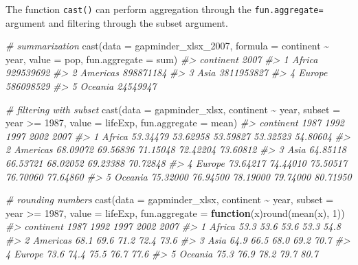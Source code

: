 \documentclass[
]{book}
\newenvironment{Shaded}{\begin{snugshade}}{\end{snugshade}}
\newcommand{\AttributeTok}[1]{\textcolor[rgb]{0.77,0.63,0.00}{#1}}
\newcommand{\CommentTok}[1]{\textcolor[rgb]{0.56,0.35,0.01}{\textit{#1}}}
\newcommand{\ControlFlowTok}[1]{\textcolor[rgb]{0.13,0.29,0.53}{\textbf{#1}}}
\newcommand{\DecValTok}[1]{\textcolor[rgb]{0.00,0.00,0.81}{#1}}
\newcommand{\FunctionTok}[1]{\textcolor[rgb]{0.00,0.00,0.00}{#1}}
\newcommand{\NormalTok}[1]{#1}
\newcommand{\SpecialCharTok}[1]{\textcolor[rgb]{0.00,0.00,0.00}{#1}}
\newcommand{\StringTok}[1]{\textcolor[rgb]{0.31,0.60,0.02}{#1}}
\begin{document}
The function \texttt{cast()} can perform aggregation through the \texttt{fun.aggregate=} argument and filtering through the subset argument.

\begin{Shaded}
\begin{Highlighting}[]
\CommentTok{\# summarization}
\FunctionTok{cast}\NormalTok{(}\AttributeTok{data =}\NormalTok{ gapminder\_xlsx\_2007, }
     \AttributeTok{formula =}\NormalTok{ continent }\SpecialCharTok{\textasciitilde{}}\NormalTok{ year, }
     \AttributeTok{value =} \StringTok{\textquotesingle{}pop\textquotesingle{}}\NormalTok{, }
     \AttributeTok{fun.aggregate =}\NormalTok{ sum)}
\CommentTok{\#\textgreater{}   continent       2007}
\CommentTok{\#\textgreater{} 1    Africa  929539692}
\CommentTok{\#\textgreater{} 2  Americas  898871184}
\CommentTok{\#\textgreater{} 3      Asia 3811953827}
\CommentTok{\#\textgreater{} 4    Europe  586098529}
\CommentTok{\#\textgreater{} 5   Oceania   24549947}

\CommentTok{\# filtering with subset}
\FunctionTok{cast}\NormalTok{(}\AttributeTok{data =}\NormalTok{ gapminder\_xlsx,}
\NormalTok{     continent }\SpecialCharTok{\textasciitilde{}}\NormalTok{ year,}
     \AttributeTok{subset =}\NormalTok{ year }\SpecialCharTok{\textgreater{}=} \DecValTok{1987}\NormalTok{,}
     \AttributeTok{value =} \StringTok{\textquotesingle{}lifeExp\textquotesingle{}}\NormalTok{, }
     \AttributeTok{fun.aggregate =}\NormalTok{ mean)}
\CommentTok{\#\textgreater{}   continent     1987     1992     1997     2002     2007}
\CommentTok{\#\textgreater{} 1    Africa 53.34479 53.62958 53.59827 53.32523 54.80604}
\CommentTok{\#\textgreater{} 2  Americas 68.09072 69.56836 71.15048 72.42204 73.60812}
\CommentTok{\#\textgreater{} 3      Asia 64.85118 66.53721 68.02052 69.23388 70.72848}
\CommentTok{\#\textgreater{} 4    Europe 73.64217 74.44010 75.50517 76.70060 77.64860}
\CommentTok{\#\textgreater{} 5   Oceania 75.32000 76.94500 78.19000 79.74000 80.71950}

\CommentTok{\# rounding numbers}
\FunctionTok{cast}\NormalTok{(}\AttributeTok{data =}\NormalTok{ gapminder\_xlsx,}
\NormalTok{     continent }\SpecialCharTok{\textasciitilde{}}\NormalTok{ year,}
     \AttributeTok{subset =}\NormalTok{ year }\SpecialCharTok{\textgreater{}=} \DecValTok{1987}\NormalTok{,}
     \AttributeTok{value =} \StringTok{\textquotesingle{}lifeExp\textquotesingle{}}\NormalTok{, }
     \AttributeTok{fun.aggregate =} \ControlFlowTok{function}\NormalTok{(x)}\FunctionTok{round}\NormalTok{(}\FunctionTok{mean}\NormalTok{(x), }\DecValTok{1}\NormalTok{))}
\CommentTok{\#\textgreater{}   continent 1987 1992 1997 2002 2007}
\CommentTok{\#\textgreater{} 1    Africa 53.3 53.6 53.6 53.3 54.8}
\CommentTok{\#\textgreater{} 2  Americas 68.1 69.6 71.2 72.4 73.6}
\CommentTok{\#\textgreater{} 3      Asia 64.9 66.5 68.0 69.2 70.7}
\CommentTok{\#\textgreater{} 4    Europe 73.6 74.4 75.5 76.7 77.6}
\CommentTok{\#\textgreater{} 5   Oceania 75.3 76.9 78.2 79.7 80.7}


\end{Highlighting}
\end{Shaded}
\end{document}
